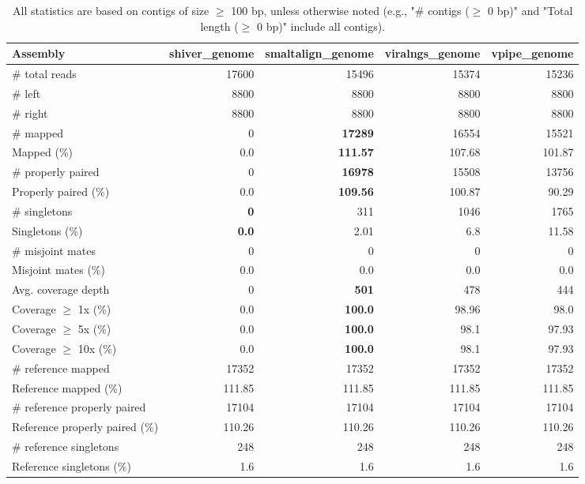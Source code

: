 \documentclass[12pt,a4paper]{article}
\begin{document}
\begin{table}[ht]
\begin{center}
\caption{All statistics are based on contigs of size $\geq$ 100 bp, unless otherwise noted (e.g., "\# contigs ($\geq$ 0 bp)" and "Total length ($\geq$ 0 bp)" include all contigs).}
\begin{tabular}{|l*{4}{|r}|}
\hline
Assembly & shiver\_genome & smaltalign\_genome & viralngs\_genome & vpipe\_genome \\ \hline
\# total reads & 17600 & 15496 & 15374 & 15236 \\ \hline
\# left & 8800 & 8800 & 8800 & 8800 \\ \hline
\# right & 8800 & 8800 & 8800 & 8800 \\ \hline
\# mapped & 0 & {\bf 17289} & 16554 & 15521 \\ \hline
Mapped (\%) & 0.0 & {\bf 111.57} & 107.68 & 101.87 \\ \hline
\# properly paired & 0 & {\bf 16978} & 15508 & 13756 \\ \hline
Properly paired (\%) & 0.0 & {\bf 109.56} & 100.87 & 90.29 \\ \hline
\# singletons & {\bf 0} & 311 & 1046 & 1765 \\ \hline
Singletons (\%) & {\bf 0.0} & 2.01 & 6.8 & 11.58 \\ \hline
\# misjoint mates & 0 & 0 & 0 & 0 \\ \hline
Misjoint mates (\%) & 0.0 & 0.0 & 0.0 & 0.0 \\ \hline
Avg. coverage depth & 0 & {\bf 501} & 478 & 444 \\ \hline
Coverage $\geq$ 1x (\%) & 0.0 & {\bf 100.0} & 98.96 & 98.0 \\ \hline
Coverage $\geq$ 5x (\%) & 0.0 & {\bf 100.0} & 98.1 & 97.93 \\ \hline
Coverage $\geq$ 10x (\%) & 0.0 & {\bf 100.0} & 98.1 & 97.93 \\ \hline
\# reference mapped & 17352 & 17352 & 17352 & 17352 \\ \hline
Reference mapped (\%) & 111.85 & 111.85 & 111.85 & 111.85 \\ \hline
\# reference properly paired & 17104 & 17104 & 17104 & 17104 \\ \hline
Reference properly paired (\%) & 110.26 & 110.26 & 110.26 & 110.26 \\ \hline
\# reference singletons & 248 & 248 & 248 & 248 \\ \hline
Reference singletons (\%) & 1.6 & 1.6 & 1.6 & 1.6 \\ \hline

\end{tabular}
\end{center}
\end{table}
\end{document}
